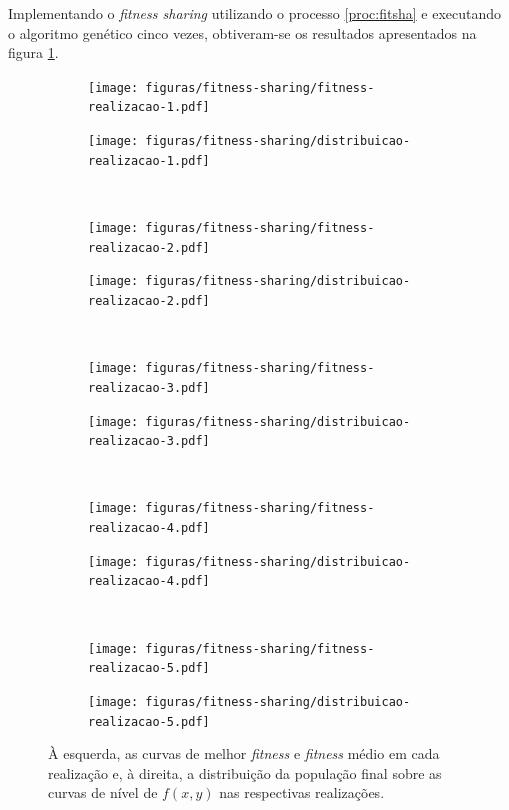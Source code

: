 \documentclass[a4paper, 12pt]{article}
\newcommand{\fitness}{\textit{fitness}\xspace}
\newcommand{\fitsha}{\textit{fitness sharing}\xspace}
\begin{document}
Implementando o \fitsha utilizando o processo \ref{proc:fitsha} e executando o algoritmo genético cinco vezes, obtiveram-se os resultados apresentados na figura \ref{fig:fitness-distribuicao-sharing}.
\begin{figure}[!ht]
    \centering
    \begin{subfigure}{0.4\textwidth}
        \texttt{[image: figuras/fitness-sharing/fitness-realizacao-1.pdf]}
    \end{subfigure}
    \begin{subfigure}{0.4\textwidth}
        \texttt{[image: figuras/fitness-sharing/distribuicao-realizacao-1.pdf]}
    \end{subfigure}
    \hfill
    \\
    \centering
    \begin{subfigure}{0.4\textwidth}
        \texttt{[image: figuras/fitness-sharing/fitness-realizacao-2.pdf]}
    \end{subfigure}
    \begin{subfigure}{0.4\textwidth}
        \texttt{[image: figuras/fitness-sharing/distribuicao-realizacao-2.pdf]}
    \end{subfigure}
    \hfill
    \\
    \centering
    \begin{subfigure}{0.4\textwidth}
        \texttt{[image: figuras/fitness-sharing/fitness-realizacao-3.pdf]}
    \end{subfigure}
    \begin{subfigure}{0.4\textwidth}
        \texttt{[image: figuras/fitness-sharing/distribuicao-realizacao-3.pdf]}
    \end{subfigure}
    \hfill
    \\
    \centering
    \begin{subfigure}{0.4\textwidth}
        \texttt{[image: figuras/fitness-sharing/fitness-realizacao-4.pdf]}
    \end{subfigure}
    \begin{subfigure}{0.4\textwidth}
        \texttt{[image: figuras/fitness-sharing/distribuicao-realizacao-4.pdf]}
    \end{subfigure}
    \hfill
    \\
    \centering
    \begin{subfigure}{0.4\textwidth}
        \texttt{[image: figuras/fitness-sharing/fitness-realizacao-5.pdf]}
    \end{subfigure}
    \begin{subfigure}{0.4\textwidth}
        \texttt{[image: figuras/fitness-sharing/distribuicao-realizacao-5.pdf]}
    \end{subfigure}
    \hfill
    \caption{À esquerda, as curvas de melhor \fitness e \fitness médio em cada realização e, à direita, a distribuição da população final sobre as curvas de nível de $f(x, y)$ nas respectivas realizações.}
    \label{fig:fitness-distribuicao-sharing}
\end{figure}
\end{document}
